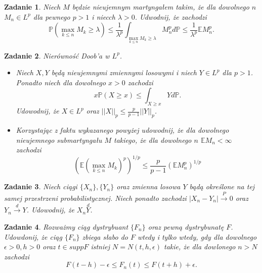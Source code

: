 \documentclass{mwart}
\newtheorem{zd}{Zadanie}
\begin{document}
\begin{zd}
Niech $M$ będzie nieujemnym martyngałem takim, że dla dowolnego $n$ $M_n\in L^p$ dla pewnego $p > 1$ i niecch $\lambda > 0$. Udwodnij, że zachodzi
\begin{displaymath}
\mathbb{P}\left(\max_{k\leq n}M_k \geq \lambda \right) \leq \frac{1}{\lambda^p}\int_{\max_{k\leq n}M_k \geq \lambda}M_n^pd\mathbb{P} \leq  \frac{1}{\lambda^p}\mathbb{E}M_n^p.
\end{displaymath}
\end{zd}
\begin{zd}Nierówność Doob'a w $L^p$.
\begin{itemize}
\item Niech $X, Y$ będą nieujemnymi zmiennymi losowymi i niech $Y\in L^p$ dla $p> 1$. Ponadto niech dla dowolnego $x>0$ zachodzi
\begin{displaymath}
x\mathbb{P}\left(X \geq x\right) \leq \int_{X \geq x}Yd\mathbb{P}.
\end{displaymath}
Udowodnij, że $X\in L^p$ oraz $||X||_p \leq \frac{p}{p-1}||Y||_p$.
\item Korzystając z faktu wykazanego powyżej udowodnij, że dla dowolnego nieujemnego submartyngału $M$ takiego, że dla dowolnego $n$ $\mathbb{E}M_n < \infty$ zachodzi
\begin{displaymath}
\left(\mathbb{E}\left(\max_{k\leq n}M_k\right)^p\right)^{1/p} \leq \frac{p}{p-1}\left(\mathbb{E}M_n^p\right)^{1/p}
\end{displaymath}
\end{itemize}
\end{zd}
\begin{zd}
Niech ciągi $\{X_n\}, \{Y_n\}$ oraz zmienna losowa $Y$ bądą określone na tej samej przestrzeni probabilistycznej. Niech ponadto zachodzi $|X_n-Y_n|\stackrel{P}{\to}0$ oraz $Y_n\stackrel{d}{\to}Y$. Udowodnij, że $X_n\stackrel{d}Y$.
\end{zd}
\begin{zd}
Rozważmy ciąg dystrybuant $\{F_n\}$ oraz pewną dystrybunatę $F$. Udowdonij, że ciąg $\{F_n\}$  zbiega słabo do $F$ wtedy i tylko wtedy, gdy dla dowolnego $\epsilon > 0, h> 0$ oraz $t\in suppF$ istniej $N = N(t, h, \epsilon)$ takie, że dla dowlonego $n > N$ zachodzi
\begin{displaymath}
F(t-h) - \epsilon \leq F_n(t)\leq F(t+h)+\epsilon.
\end{displaymath}
\end{zd}
\end{document}
